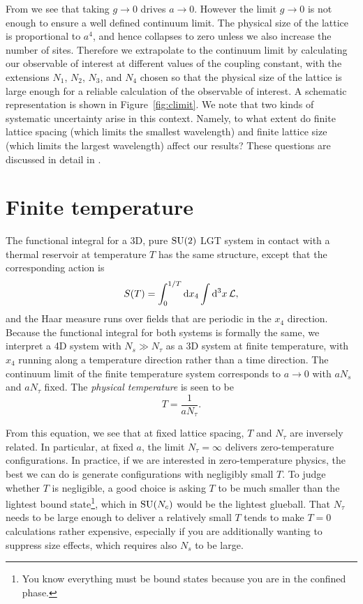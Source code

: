 From  we see that taking $g\to0$ drives $a\to0$.
However the limit $g\to0$ is not enough to ensure a well defined continuum
limit. The physical size of the lattice is proportional to $a^4$, and hence
collapses to zero unless we also increase the number of sites. Therefore
we extrapolate to the continuum limit by calculating our observable
of interest at different values of the coupling constant, with the 
extensions $N_1$, $N_2$, $N_3$, and $N_4$ chosen so that the physical 
size of the lattice is large enough for a reliable calculation of 
the observable of interest. A schematic representation is shown in
Figure~\ref{fig:climit}. We note that two kinds of systematic uncertainty 
arise in this context. Namely, to what extent do finite lattice
spacing (which limits the smallest wavelength) and finite lattice
size (which limits the largest wavelength) affect our results?
These questions are discussed in detail in 
.

\section{Finite temperature}\label{sec:finitetemp}

The functional integral for a 3D, 
pure $\operatorname{SU}(2)$ LGT system in contact with a thermal reservoir at 
temperature $T$ has the same structure, except that the corresponding 
action is
\begin{equation}\label{eq:Tintegral}
  S(T)=\int_0^{1/T}\dd{x_4}\int\dd[3]{x}\mathcal{L},
\end{equation}
and the Haar measure runs over fields that are periodic in the
$x_4$ direction. Because the functional integral for both systems is
formally the same, we interpret a 4D system with $N_s\gg N_\tau$ as
a 3D system at finite temperature, with $x_4$ running along a 
temperature direction rather than a time direction.
The continuum limit of the finite temperature system corresponds
to $a\to0$ with $aN_s$ and $aN_\tau$ fixed. The {\it physical
temperature} is seen to be
\begin{equation}\label{eq:latticeTemp}
  T=\frac{1}{aN_\tau}.
\end{equation}

From this equation, we see that at fixed lattice spacing, $T$ and $N_\tau$ are
inversely related. In particular, at fixed $a$, the limit $N_\tau=\infty$
delivers zero-temperature configurations. In practice, if we are interested in
zero-temperature physics, the best we can do is generate configurations with
negligibly small $T$. To judge whether $T$ is negligible, a good choice is
asking $T$ to be much smaller than the lightest bound state\footnote{You know
everything must be bound states because you are in the confined phase.}, 
which in $\operatorname{SU}(N_c)$ would be the lightest glueball. That $N_\tau$ needs to be
large enough to deliver a relatively small $T$ tends to make $T=0$ calculations
rather expensive, especially if you are additionally wanting to suppress size
effects, which requires also $N_s$ to be large.

